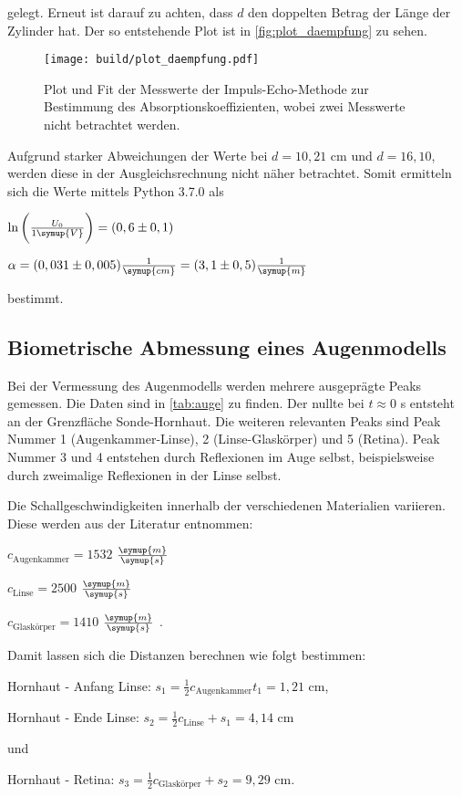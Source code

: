 gelegt. Erneut ist darauf zu achten, dass $d$ den doppelten Betrag der Länge der Zylinder hat.
Der so entstehende Plot ist in \autoref{fig:plot_daempfung} zu sehen.

\begin{figure}
    \centering
    \texttt{[image: build/plot\_daempfung.pdf]}
    \caption{Plot und Fit der Messwerte der Impuls-Echo-Methode zur Bestimmung des Absorptionskoeffizienten, wobei zwei Messwerte nicht betrachtet werden.}
    \label{fig:plot_daempfung}
\end{figure}

Aufgrund starker Abweichungen der Werte bei $d = 10,21$ cm und $d = 16,10$, werden diese in der Ausgleichsrechnung nicht näher betrachtet.
Somit ermitteln sich die Werte mittels Python 3.7.0 als

\begin{center}
    $\ln \bigg( \frac{U_0}{1\symup{V}} \bigg) = (0,6 \pm 0,1)$

    $\alpha = (0,031 \pm 0,005) \frac{1}{\symup{cm}} = (3,1 \pm 0,5) \frac{1}{\symup{m}}$
\end{center}

bestimmt.

\subsection{Biometrische Abmessung eines Augenmodells}

Bei der Vermessung des Augenmodells werden mehrere ausgeprägte Peaks gemessen. Die Daten sind in \autoref{tab:auge} zu finden.
Der nullte bei $t \approx 0$ s entsteht an der Grenzfläche Sonde-Hornhaut. Die weiteren relevanten Peaks sind Peak Nummer 1 (Augenkammer-Linse), 2 (Linse-Glaskörper) und 5 (Retina).
Peak Nummer 3 und 4 entstehen durch Reflexionen im Auge selbst, beispielsweise durch zweimalige Reflexionen in der Linse selbst.



Die Schallgeschwindigkeiten innerhalb der verschiedenen Materialien variieren. Diese werden aus der Literatur entnommen:

\begin{center}
    $c_\text{Augenkammer} = 1532$ $\frac{\symup{m}}{\symup{s}}$\cite[63]{augeZahlen}

    $c_\text{Linse} = 2500$ $\frac{\symup{m}}{\symup{s}}$ \cite{US1}

    $c_\text{Glaskörper} = 1410$ $\frac{\symup{m}}{\symup{s}}$ \cite{US1}.
\end{center}

Damit lassen sich die Distanzen berechnen wie folgt bestimmen:

\begin{center}
    Hornhaut - Anfang Linse: $s_1 = \frac{1}{2} c_\text{Augenkammer} t_1 = 1,21$ cm,

    Hornhaut - Ende Linse: $s_2 = \frac{1}{2} c_\text{Linse} + s_1 = 4,14$ cm

    und

    Hornhaut - Retina: $s_3 = \frac{1}{2} c_\text{Glaskörper} + s_2 = 9,29$ cm.
\end{center}